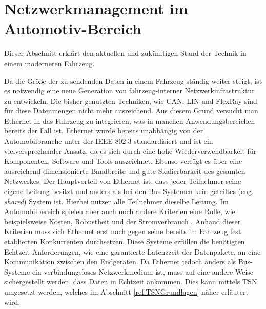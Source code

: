 \section{Netzwerkmanagement im Automotiv-Bereich}
Dieser Abschnitt erklärt den aktuellen und zukünftigen Stand der Technik in einem moderneren Fahrzeug.  

Da die Größe der zu sendenden Daten in einem Fahrzeug ständig weiter steigt, ist es notwendig eine neue Generation von fahrzeug-interner Netzwerkinfrastruktur zu entwickeln. Die bisher genutzten Techniken, wie \acf{CAN}, \acf{LIN} und FlexRay sind für diese Datenmengen nicht mehr ausreichend. Aus diesem Grund versucht man Ethernet in das Fahrzeug zu integrieren, was in manchen Anwendungsbereichen bereits der Fall ist. Ethernet wurde bereits unabhängig von der Automobilbranche unter der IEEE 802.3 \cite{IEEE802_3} standardisiert und ist ein vielversprechender Ansatz, da es sich durch eine hohe Wiederverwendbarkeit für Komponenten, Software und Tools auszeichnet. Ebenso verfügt es über eine ausreichend dimensionierte Bandbreite und gute Skalierbarkeit des gesamten Netzwerkes. Der Hauptvorteil von Ethernet ist, dass jeder Teilnehmer seine eigene Leitung besitzt und anders als bei den Bus-Systemen kein geteiltes (eng. \emph{shared}) System ist. Hierbei nutzen alle Teilnehmer dieselbe Leitung. Im Automobilbereich spielen aber auch noch andere Kriterien eine Rolle, wie beispielsweise Kosten, Robustheit und der Stromverbrauch \cite{AutomotiveApplications}. Anhand dieser Kriterien muss sich Ethernet erst noch gegen seine bereits im Fahrzeug fest etablierten Konkurrenten durchsetzen. Diese Systeme erfüllen die benötigten Echtzeit-Anforderungen, wie eine garantierte Latenzzeit der Datenpakete, an eine Kommunikation zwischen den Endgeräten. Da Ethernet jedoch anders als Bus-Systeme ein verbindungsloses Netzwerkmedium ist, muss auf eine andere Weise sichergestellt werden, dass Daten in Echtzeit ankommen. Dies kann mittels \acf{TSN} umgesetzt werden, welches im Abschnitt \ref{ref:TSNGrundlagen} näher erläutert wird.


